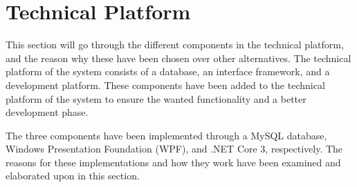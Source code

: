 \section{Technical Platform} \label{sc:tech_intro}
This section will go through the different components in the technical platform, and the reason why these have been chosen over other alternatives. The technical platform of the system consists of a database, an interface framework, and a development platform. These components have been added to the technical platform of the system to ensure the wanted functionality and a better development phase.
\par
The three components have been implemented through a MySQL database, Windows Presentation Foundation (WPF), and .NET Core 3, respectively. The reasons for these implementations and how they work have been examined and elaborated upon in this section.